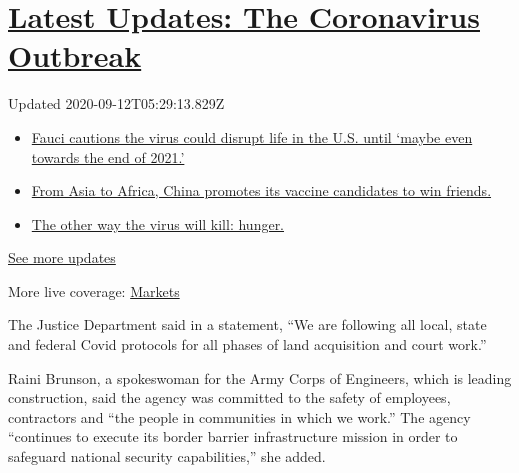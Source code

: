\hypertarget{latest-updates-the-coronavirus-outbreak}{%
\section{\texorpdfstring{\href{https://www.nytimes3xbfgragh.onion/2020/09/11/world/covid-19-coronavirus.html?action=click\&pgtype=Article\&state=default\&region=MAIN_CONTENT_1\&context=storylines_live_updates}{Latest
Updates: The Coronavirus
Outbreak}}{Latest Updates: The Coronavirus Outbreak}}\label{latest-updates-the-coronavirus-outbreak}}

Updated 2020-09-12T05:29:13.829Z

\begin{itemize}
\tightlist
\item
  \href{https://www.nytimes3xbfgragh.onion/2020/09/11/world/covid-19-coronavirus.html?action=click\&pgtype=Article\&state=default\&region=MAIN_CONTENT_1\&context=storylines_live_updates\#link-dfb8a16}{Fauci
  cautions the virus could disrupt life in the U.S. until `maybe even
  towards the end of 2021.'}
\item
  \href{https://www.nytimes3xbfgragh.onion/2020/09/11/world/covid-19-coronavirus.html?action=click\&pgtype=Article\&state=default\&region=MAIN_CONTENT_1\&context=storylines_live_updates\#link-7104d154}{From
  Asia to Africa, China promotes its vaccine candidates to win friends.}
\item
  \href{https://www.nytimes3xbfgragh.onion/2020/09/11/world/covid-19-coronavirus.html?action=click\&pgtype=Article\&state=default\&region=MAIN_CONTENT_1\&context=storylines_live_updates\#link-393ad215}{The
  other way the virus will kill: hunger.}
\end{itemize}

\href{https://www.nytimes3xbfgragh.onion/2020/09/11/world/covid-19-coronavirus.html?action=click\&pgtype=Article\&state=default\&region=MAIN_CONTENT_1\&context=storylines_live_updates}{See
more updates}

More live coverage:
\href{https://www.nytimes3xbfgragh.onion/live/2020/09/11/business/stock-market-today-coronavirus?action=click\&pgtype=Article\&state=default\&region=MAIN_CONTENT_1\&context=storylines_live_updates}{Markets}

The Justice Department said in a statement, ``We are following all
local, state and federal Covid protocols for all phases of land
acquisition and court work.''

Raini Brunson, a spokeswoman for the Army Corps of Engineers, which is
leading construction, said the agency was committed to the safety of
employees, contractors and ``the people in communities in which we
work.'' The agency ``continues to execute its border barrier
infrastructure mission in order to safeguard national security
capabilities,'' she added.

